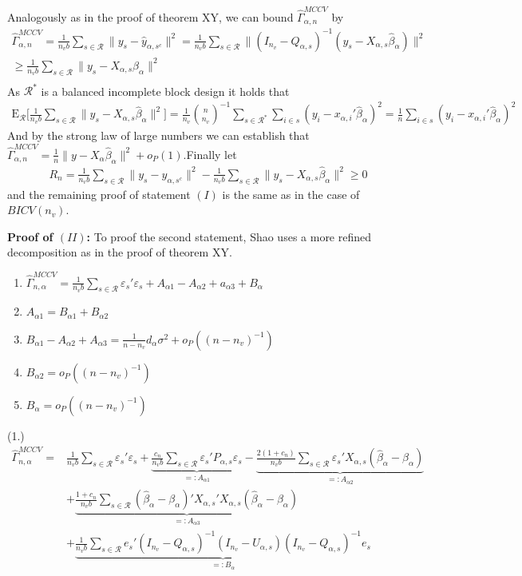 \documentclass[Research_Module_ES.tex]{subfiles}
\begin{document}
Analogously as in the proof of theorem XY, we can bound $\hat{\Gamma}_{\alpha,n}^{MCCV}$ by
\begin{align*}
\hat{\Gamma}_{\alpha,n}^{MCCV}= \frac{1}{n_vb}\sum_{s\in \mathcal{R}}\lVert y_s-\hat{y}_{\alpha,s^c}\rVert^2
= \frac{1}{n_vb}\sum_{s\in \mathcal{R}}\lVert (I_{n_v}-Q_{\alpha,s})^{-1}(y_s-X_{\alpha,s}\hat{\beta}_\alpha)\rVert^2\\
\ge \frac{1}{n_vb}\sum_{s\in \mathcal{R}}\lVert y_s-X_{\alpha,s}\hat{\beta}_\alpha\rVert^2\\
\end{align*}
As $\mathcal{R}^\ast$ is a balanced incomplete block design it holds that
\begin{align*}
\mathrm{E}_\mathcal{R} \biggl[\frac{1}{n_vb}\sum_{s\in \mathcal{R}}\lVert y_s-X_{\alpha,s}\hat{\beta}_\alpha\rVert^2 \biggr] 
= \frac{1}{n_v}\binom{n}{n_v}^{-1}\sum_{s\in \mathcal{R}^\ast}\sum_{i\in s}(y_i-x_{\alpha,i}'\hat{\beta}_\alpha)^2
= \frac{1}{n}\sum_{i\in s}(y_i-x_{\alpha,i}'\hat{\beta}_\alpha)^2
\end{align*}
And by the strong law of large numbers 
we can establish that $\hat{\Gamma}_{\alpha,n}^{MCCV} = \frac{1}{n}\lVert y-X_{\alpha}\hat{\beta}_\alpha\rVert^2 + o_P(1)$.Finally let
\begin{align*}
R_n= \frac{1}{n_vb}\sum_{s\in \mathcal{R}}\lVert y_s-\hat{y}_{\alpha,s^c}\rVert^2- \frac{1}{n_vb}\sum_{s\in \mathcal{R}}\lVert y_s-X_{\alpha,s}\hat{\beta}_\alpha\rVert^2 \ge 0
\end{align*} 
and the remaining proof of statement $(I)$ is the same as in the case of $BICV(n_v)$.

\textbf{Proof of $(II)$:}
To proof the second statement, Shao uses a more refined decomposition as in the proof of theorem XY. 
\begin{enumerate}
\item  $\hat{\Gamma}_{n,\alpha}^{MCCV} = \frac{1}{n_vb}\sum_{s\in \mathcal{R}}\varepsilon_s'\varepsilon_s+ A_{\alpha1}-A_{\alpha2}+a_{\alpha3}+B_\alpha$
\item $A_{\alpha1} = B_{\alpha1}+ B_{\alpha2}$
\item $ B_{\alpha1}-A_{\alpha2}+A_{\alpha3} = \frac{1}{n-n_v}d_\alpha\sigma^2 + o_P((n-n_v)^{-1})$
\item $B_{\alpha2} = o_P((n-n_v)^{-1})$
\item $B_{\alpha} = o_P((n-n_v)^{-1})$
\end{enumerate}
(1.) 
\begin{align*}
\hat{\Gamma}_{n,\alpha}^{MCCV} 
= &\frac{1}{n_vb}\sum_{s\in \mathcal{R}}\varepsilon_s'\varepsilon_s 
+ \underbrace{\frac{c_n}{n_vb}\sum_{s\in \mathcal{R}}\varepsilon_s'P_{\alpha,s}\varepsilon_s}_{=:A_{\alpha1}}
- \underbrace{\frac{2(1+c_n)}{n_vb}\sum_{s\in \mathcal{R}}\varepsilon_s'X_{\alpha,s}(\hat{\beta}_\alpha-\beta_\alpha)}_{=:A_{\alpha2}}\\
&+ \underbrace{\frac{1+c_n}{n_vb}\sum_{s\in \mathcal{R}}(\hat{\beta}_\alpha-\beta_\alpha)'X_{\alpha,s}'X_{\alpha,s}(\hat{\beta}_\alpha-\beta_\alpha)}_{=:A_{\alpha3}}\\
&+ \underbrace{\frac{1}{n_vb}\sum_{s\in\mathcal{R}}e_s'(I_{n_v}-Q_{\alpha,s})^{-1}(I_{n_v}-U_{\alpha,s})(I_{n_v}-Q_{\alpha,s})^{-1}e_s}_{=:B_{\alpha}}
\end{align*}
\end{document}
